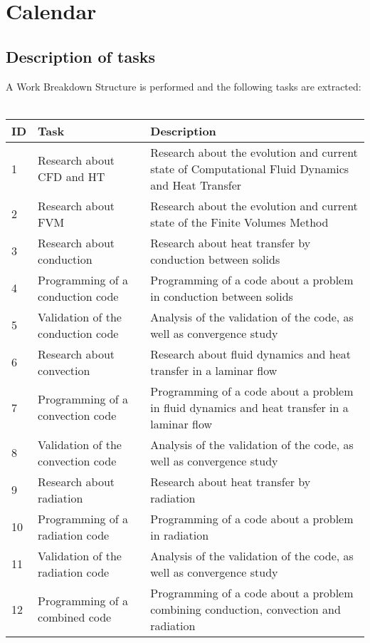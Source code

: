 \section{Calendar}

\subsection{Description of tasks}
A Work Breakdown Structure is performed and the following tasks are extracted:\\
\\
\begin{tabular}{|p{1cm}|p{4cm}|p{10cm}|}
\hline 
ID & Task & Description \\ 
\hline 
1 & Research about CFD and HT & Research about the evolution and current state of Computational Fluid Dynamics and Heat Transfer \\ 
\hline 
2 & Research about FVM & Research about the evolution and current state of the Finite Volumes Method \\ 
\hline 
3 & Research about conduction & Research about heat transfer by conduction between solids \\ 
\hline 
4 & Programming of a conduction code & Programming of a code about a problem in conduction between solids \\ 
\hline 
5 & Validation of the conduction code & Analysis of the validation of the code, as well as convergence study \\ 
\hline 
6 & Research about convection & Research about fluid dynamics and heat transfer in a laminar flow \\ 
\hline 
7 & Programming of a convection code & Programming of a code about a problem in fluid dynamics and heat transfer in a laminar flow \\ 
\hline 
8 & Validation of the convection code & Analysis of the validation of the code, as well as convergence study \\ 
\hline 
9 & Research about radiation & Research about heat transfer by radiation \\ 
\hline 
10 & Programming of a radiation code & Programming of a code about a problem in radiation \\ 
\hline 
11 & Validation of the radiation code & Analysis of the validation of the code, as well as convergence study \\ 
\hline 
12 & Programming of a combined code & Programming of a code about a problem combining conduction, convection and radiation \\ 

\end{tabular}
